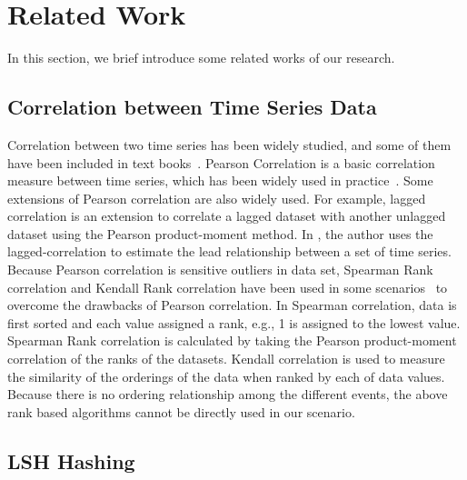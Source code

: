 \section{Related Work}
\label{sec:relatedwork}
In this section, we brief introduce some related works of our research.

\subsection{Correlation between Time Series Data}
Correlation between two time series has been widely studied, and some of them have been included in text books~\cite{johnson2002applied}. Pearson Correlation \cite{nagelkerke1991note} is a basic correlation measure between time series, which has been widely used in practice~\cite{Zhu:VLDB:2002}. Some extensions of Pearson correlation are also widely used. For example, lagged correlation is an extension to correlate a lagged dataset with another unlagged dataset using the Pearson product-moment method. In \cite{wu2010detecting}, the author uses the lagged-correlation to estimate the lead relationship between a set of time series. Because Pearson correlation is sensitive outliers in data set, Spearman Rank correlation and Kendall Rank correlation have been used in some scenarios~\cite{Lehman:SAS:2005} to overcome the drawbacks of Pearson correlation. In Spearman correlation, data is first sorted and each value assigned a rank, e.g., 1 is assigned to the lowest value. Spearman Rank correlation is calculated by taking the Pearson product-moment correlation of the ranks of the datasets. Kendall correlation is used to measure the similarity of the orderings of the data when ranked by each of data values. Because there is no ordering relationship among the different events, the above rank based algorithms cannot be directly used in our scenario.

\subsection{LSH Hashing}


